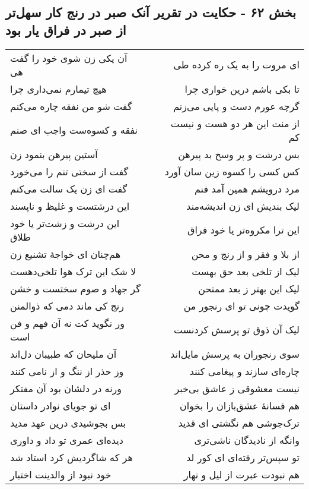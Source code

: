 \begin{center}
\section*{بخش ۶۲ - حکایت در تقریر آنک صبر در رنج کار سهل‌تر از صبر در فراق یار بود}
\label{sec:sh062}
\begin{longtable}{l p{0.5cm} r}
آن یکی زن شوی خود را گفت هی
&&
ای مروت را به یک ره کرده طی
\\
هیچ تیمارم نمی‌داری چرا
&&
تا بکی باشم درین خواری چرا
\\
گفت شو من نفقه چاره می‌کنم
&&
گرچه عورم دست و پایی می‌زنم
\\
نفقه و کسوه‌ست واجب ای صنم
&&
از منت این هر دو هست و نیست کم
\\
آستین پیرهن بنمود زن
&&
بس درشت و پر وسخ بد پیرهن
\\
گفت از سختی تنم را می‌خورد
&&
کس کسی را کسوه زین سان آورد
\\
گفت ای زن یک سالت می‌کنم
&&
مرد درویشم همین آمد فنم
\\
این درشتست و غلیظ و ناپسند
&&
لیک بندیش ای زن اندیشه‌مند
\\
این درشت و زشت‌تر یا خود طلاق
&&
این ترا مکروه‌تر یا خود فراق
\\
هم‌چنان ای خواجهٔ تشنیع زن
&&
از بلا و فقر و از رنج و محن
\\
لا شک این ترک هوا تلخی‌دهست
&&
لیک از تلخی بعد حق بهست
\\
گر جهاد و صوم سختست و خشن
&&
لیک این بهتر ز بعد ممتحن
\\
رنج کی ماند دمی که ذوالمنن
&&
گویدت چونی تو ای رنجور من
\\
ور نگوید کت نه آن فهم و فن است
&&
لیک آن ذوق تو پرسش کردنست
\\
آن ملیحان که طبیبان دل‌اند
&&
سوی رنجوران به پرسش مایل‌اند
\\
وز حذر از ننگ و از نامی کنند
&&
چاره‌ای سازند و پیغامی کنند
\\
ورنه در دلشان بود آن مفتکر
&&
نیست معشوقی ز عاشق بی‌خبر
\\
ای تو جویای نوادر داستان
&&
هم فسانهٔ عشق‌بازان را بخوان
\\
بس بجوشیدی درین عهد مدید
&&
ترک‌جوشی هم نگشتی ای قدید
\\
دیده‌ای عمری تو داد و داوری
&&
وانگه از نادیدگان ناشی‌تری
\\
هر که شاگردیش کرد استاد شد
&&
تو سپس‌تر رفته‌ای ای کور لد
\\
خود نبود از والدینت اختبار
&&
هم نبودت عبرت از لیل و نهار
\\
\end{longtable}
\end{center}

